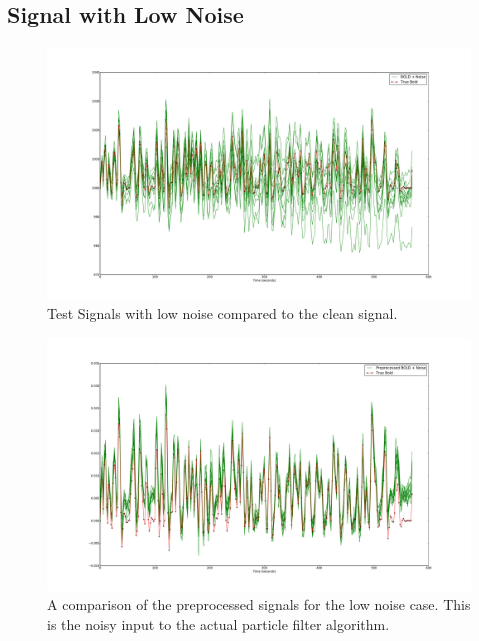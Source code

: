 \subsection{Signal with Low Noise}
\begin{figure}
\includegraphics[clip=true,trim=6cm 2cm 6cm 3.5cm,width=17cm]{images/realization_lownoise}
\caption{Test Signals with low noise compared to the clean signal.}
\label{fig:LowNoiseRealization}
\end{figure}

\begin{figure}
\includegraphics[clip=true,trim=6cm 2cm 6cm 3.5cm,width=17cm]{images/preprocessed_lownoise}
\caption{A comparison of the preprocessed signals for the low noise case. This is the
noisy input to the actual particle filter algorithm.}
\label{fig:PreprocessedLowNoise}
\end{figure}

